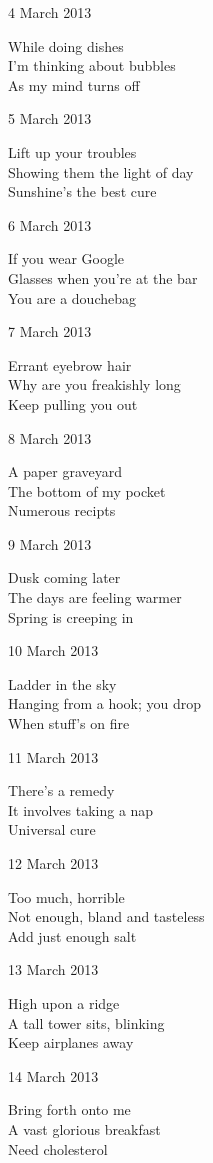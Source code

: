 \documentclass[12pt]{article}
\begin{document}
4 March 2013

While doing dishes \\
I'm thinking about bubbles \\
As my mind turns off

5 March 2013

Lift up your troubles \\
Showing them the light of day \\
Sunshine's the best cure

6 March 2013

If you wear Google \\
Glasses when you're at the bar \\
You are a douchebag

7 March 2013

Errant eyebrow hair \\
Why are you freakishly long \\
Keep pulling you out

8 March 2013

A paper graveyard \\
The bottom of my pocket \\
Numerous recipts

9 March 2013

Dusk coming later \\
The days are feeling warmer \\
Spring is creeping in

10 March 2013

Ladder in the sky \\
Hanging from a hook; you drop \\
When stuff's on fire

\newpage

11 March 2013

There's a remedy \\
It involves taking a nap \\
Universal cure

12 March 2013

Too much, horrible \\
Not enough, bland and tasteless \\
Add just enough salt

13 March 2013

High upon a ridge \\
A tall tower sits, blinking \\
Keep airplanes away

14 March 2013

Bring forth onto me \\
A vast glorious breakfast \\
Need cholesterol
\end{document}

